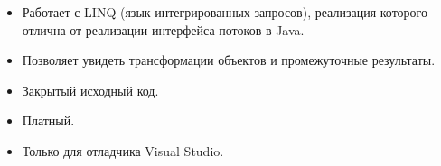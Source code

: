 \begin{frame}
\frametitle{\insertsection} 
\framesubtitle{\insertsubsection}
\begin{itemize}
	\item Работает с LINQ (язык интегрированных запросов), реализация которого отлична от реализации интерфейса потоков в Java.
	\item Позволяет увидеть трансформации объектов и промежуточные результаты.
	\item Закрытый исходный код.
	\item Платный.
	\item Только для отладчика Visual Studio.
\end{itemize}
\end{frame}
